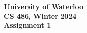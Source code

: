 \documentclass[12pt]{article}
\begin{document}
\begin{center}
  {\Large\bf University of Waterloo}\\ \vspace{3mm}
  {\Large\bf CS 486, Winter 2024}\\ \vspace{2mm}
  {\Large\bf Assignment 1}\\ \vspace{3mm}
\end{center}

\def\question#1{\item[\bf #1.]}
\def\part#1{\item[\bf #1)]}
\newcommand{\pc}[1]{\mbox{\textbf{#1}}} %

\end{document}
